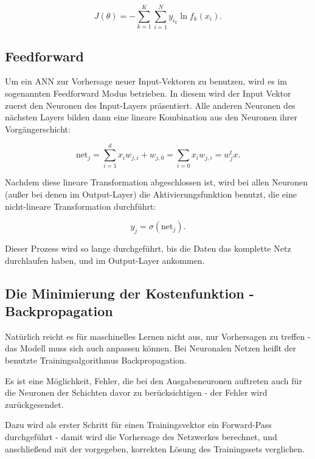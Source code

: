 \begin{equation}
    J(\theta) = -\sum_{k=1}^K \sum_{i=1}^N y_{i_k} \ln f_k(x_i).
\end{equation}


\subsection{Feedforward}
Um ein ANN zur Vorhersage neuer Input-Vektoren zu benutzen, wird es im sogenannten Feedforward Modus betrieben. In diesem wird der Input Vektor zuerst den Neuronen des Input-Layers präsentiert. Alle anderen Neuronen des nächsten Layers bilden dann eine lineare Kombination aus den Neuronen ihrer Vorgängerschicht: 

\begin{equation}
\text{net}_j = \sum_{i=1}^d x_i w_{j,i} + w_{j,0} = \sum_{i=0} x_i w_{j,i} = 
w_j^t x.
\end{equation}

Nachdem diese lineare Transformation abgeschlossen ist, wird bei allen Neuronen (außer bei denen im Output-Layer) die Aktivierungsfunktion benutzt, die eine nicht-lineare Transformation durchführt: 

\begin{equation}
y_j = \sigma (\text{net}_j).
\end{equation}

Dieser Prozess wird so lange durchgeführt, bis die Daten das komplette Netz durchlaufen haben, und im Output-Layer ankommen.

\cite{duda2012pattern}

\subsection{Die Minimierung der Kostenfunktion - Backpropagation}

Natürlich reicht es für maschinelles Lernen nicht aus, nur Vorhersagen zu treffen - das Modell muss sich auch anpassen können. Bei Neuronalen Netzen heißt der benutzte Trainingsalgorithmus Backpropagation.

Es ist eine Möglichkeit, Fehler, die bei den Ausgabeneuronen auftreten auch für die Neuronen der Schichten davor zu berücksichtigen - der Fehler wird zurückgesendet.

Dazu wird als erster Schritt für einen Trainingsvektor ein Forward-Pass durchgeführt - damit wird die Vorhersage des Netzwerkes berechnet, und anschließend mit der vorgegeben, korrekten Lösung des Trainingssets verglichen.

